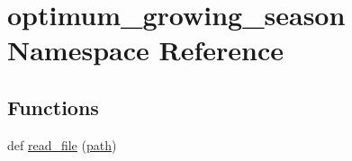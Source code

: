 \hypertarget{namespaceoptimum__growing__season}{}\section{optimum\+\_\+growing\+\_\+season Namespace Reference}
\label{namespaceoptimum__growing__season}
\subsection*{Functions}
\begin{DoxyCompactItemize}
\item 
def \hyperlink{namespaceoptimum__growing__season_a39480590780518ff82e7c259a8154086}{read\+\_\+file} (\hyperlink{namespaceoptimum__growing__season_a8ff964a02946ca58f934b298b97d02a5}{path})
\end{DoxyCompactItemize}
